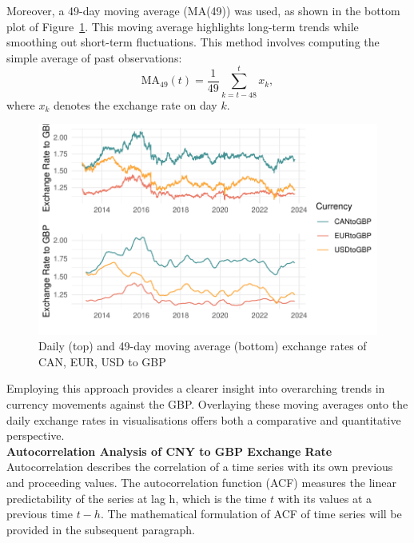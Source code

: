 \documentclass{article}\usepackage[]{graphicx}\usepackage[]{xcolor}
\makeatletter
\def\maxwidth{ %
  \ifdim\Gin@nat@width>\linewidth
    \linewidth
  \else
    \Gin@nat@width
  \fi
}
\newenvironment{knitrout}{}{} %
\numberwithin{equation}{section}
\makeatother
\begin{document}
\noindent Moreover, a 49-day moving average (MA(49)) was used, as shown in the bottom plot of Figure~\ref{fig:all exchange rates}. This moving average highlights long-term trends while smoothing out short-term fluctuations. This method involves computing the simple average of past observations:
\[\text{MA}_{49}(t) = \frac{1}{49} \sum_{k=t-48}^{t} x_k,\] 
where \( x_k \) denotes the exchange rate on day $k$.\\



\begin{knitrout}\scriptsize
{}\color{fgcolor}\begin{figure}[H]

{\centering \includegraphics[width=\maxwidth]{figure/beamer-all_exchange_rates-1} 

}

\caption[Daily (top) and 49-day moving average (bottom) exchange rates of CAN, EUR, USD to GBP]{Daily (top) and 49-day moving average (bottom) exchange rates of CAN, EUR, USD to GBP}\label{fig:all exchange rates}
\end{figure}

\end{knitrout}

\noindent
Employing this approach provides a clearer insight into overarching trends in currency movements against the GBP. Overlaying these moving averages onto the daily exchange rates in visualisations offers both a comparative and quantitative perspective.\\

\noindent
\textbf{Autocorrelation Analysis of CNY to GBP Exchange Rate}\\
\noindent
Autocorrelation describes the correlation of a time series with its own previous and proceeding values. The autocorrelation function (ACF) measures the linear predictability of the series at lag h, which is the time $t$ with its values at a previous time $t-h$. The mathematical formulation of ACF of time series will be provided in the subsequent paragraph.\\
\end{document}
